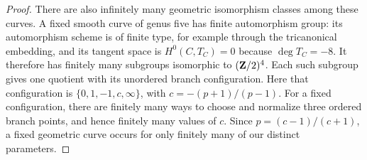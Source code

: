 \begin{proof}
There are also infinitely many geometric isomorphism classes among these
curves. A fixed smooth curve of genus five has finite automorphism group:
its automorphism scheme is of finite type, for example through the
tricanonical embedding, and its tangent space is $H^0(C,T_C)=0$ because
$\deg T_C=-8$. It therefore has finitely many subgroups isomorphic to
$(\mathbf Z/2)^4$. Each such subgroup gives one quotient with its unordered
branch configuration. Here that configuration is
$\{0,1,-1,c,\infty\}$, with $c=-(p+1)/(p-1)$. For a fixed configuration,
there are finitely many ways to choose and normalize three ordered branch
points, and hence finitely many values of $c$. Since $p=(c-1)/(c+1)$,
a fixed geometric curve occurs for only finitely many of our distinct
parameters.
\end{proof}
